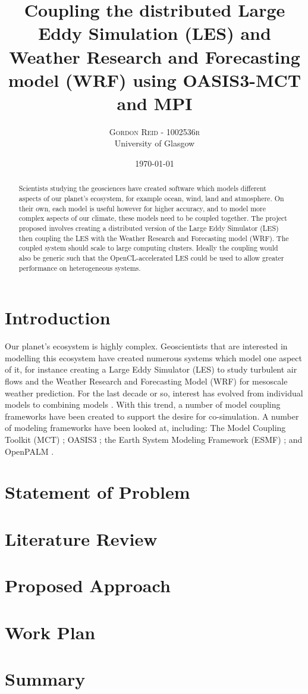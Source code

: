 \documentclass[twocolumn]{article}
\title{Coupling the distributed Large Eddy Simulation (LES) and Weather
Research and Forecasting model (WRF) using OASIS3-MCT and MPI}
\author{\large\textsc{Gordon Reid - 1002536r}\\University of Glasgow}
\date{\today}
\begin{document}
\setlength{\parskip}{0.3cm}

\maketitle

\begin{abstract}

\noindent Scientists studying the geosciences have created software which models
different aspects of our planet's ecosystem, for example ocean, wind, land and
atmosphere. On their own, each model is useful however for higher accuracy, and
to model more complex aspects of our climate, these models need to be coupled
together. The project proposed involves creating a distributed version of the
Large Eddy Simulator (LES) then coupling the LES with the Weather Research and
Forecasting model (WRF). The coupled system should scale to large computing
clusters. Ideally the coupling would also be generic such that the
OpenCL-accelerated LES could be used to allow greater performance on
heterogeneous systems.

\end{abstract}

\section*{Introduction}

Our planet's ecosystem is highly complex. Geoscientists that are interested in
modelling this ecosystem have created numerous systems which model one aspect of
it, for instance creating a Large Eddy Simulator (LES) to study turbulent air
flows \cite{Nakayama2011,Nakayama2012} and the Weather Research and Forecasting
Model (WRF) for mesoscale weather prediction. For the last decade or so,
interest has evolved from individual models to combining models
\cite{Michalakes2010}. With this trend, a number of model coupling frameworks
have been created to support the desire for co-simulation. A number of modeling
frameworks have been looked at, including: The Model Coupling Toolkit (MCT)
\cite{Larson2005}; OASIS3 \cite{Valcke,Valcke2013}; the Earth System Modeling
Framework (ESMF) \cite{Ramework2004}; and OpenPALM \cite{Piacentini2011}.

\section*{Statement of Problem}

\section*{Literature Review}

\section*{Proposed Approach}

\section*{Work Plan}

\section*{Summary}



\end{document}
